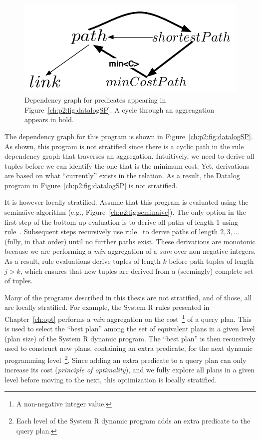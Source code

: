 \begin{figure} 
\ssp
\begin{center}
\includegraphics[scale=0.75]{figures/dependency-graph2}
\caption{\label{ch:p2:fig:dependency2}Dependency graph for predicates 
appearing in Figure~\ref{ch:p2:fig:datalogSP}. A cycle through an aggreagation
appears in bold. }
\end{center} 
\end{figure}

The dependency graph for this program is shown in
Figure~\ref{ch:p2:fig:datalogSP}.  As shown, this program is not stratified
since there is a cyclic path in the rule dependency graph that traverses an
aggregation.  Intuitively, we need to derive all  tuples before we can
identify the one that is the minimum cost.  Yet,  derivations are
based on what ``currently'' exists in the  relation.  As a
result, the Datalog program in Figure~\ref{ch:p2:fig:datalogSP} is not
stratified.

It is however locally stratified.  Assume that this program is evaluated using
the semina\"{\i}ve algorithm (e.g., Figure~\ref{ch:p2:fig:seminaive}).  The
only option in the first step of the bottom-up evaluation is to derive all
paths of length $1$ using rule~.  Subsequent steps recursively use
rule~ to derive paths of length $2, 3, \ldots$ (fully, in that order)
until no further paths exist.  These derivations are monotonic because we are
performing a {\em min} aggregation of a {\em sum} over non-negative integers.
As a result, rule evaluations derive  tuples of length $k$ before path
tuples of length $j > k$, which ensures that new  tuples are derived
from a (seemingly) complete set of  tuples.

Many of the programs described in this thesis are not stratified, and of those,
all are locally stratified.  For example, the System R rules presented in
Chapter~\ref{ch:opt} performs a {\em min} aggregation on the cost~\footnote{ A
non-negative integer value.} of a query plan.  This is used to select the
``best plan'' among the set of equivalent plans in a given level (plan size) of
the System R dynamic program.  The ``best plan'' is then recursively used to
construct new plans, containing an extra predicate, for the next dynamic
programming level~\footnote{Each level of the System R dynamic program adds an
extra predicate to the query plan.}.  Since adding an extra predicate to a
query plan can only increase its cost ({\em principle of optimality}), and we
fully explore all plans in a given level before moving to the next, this
optimization is locally stratified.


